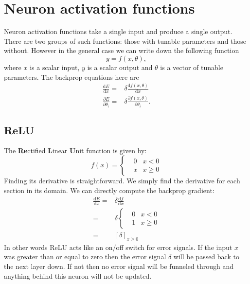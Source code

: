 \documentclass[a4paper]{article}
\begin{document}
\newpage
\section{Neuron activation functions} \label{activation-functions}
Neuron activation functions take a single input and produce a single output. There are two groups of such functions: those with tunable parameters and those without. However in the general case we can write down the following function
\begin{equation}
y = f(x,\theta),
\end{equation}
where $x$ is a scalar input, $y$ is a scalar output and $\theta$ is a vector of tunable parameters. The backprop equations here are 
\begin{align} \label{eq:elementwise}
\frac{\mathrm{d} E }{\mathrm{d} x} = & \delta \frac{\mathrm{d} f(x,\theta)}{\mathrm{d} x}\\
\frac{\partial E }{\partial \theta_i} = & \delta \frac{\partial f(x,\theta)}{\partial \theta_i}.
\end{align}

\subsection{ReLU}
The {\bf Re}ctified {\bf L}inear {\bf U}nit function is given by:
\begin{equation}
f(x)=\left\{\begin{matrix}
 & 0 & x< 0\\ 
 & x & x \geq 0
\end{matrix}\right.
\end{equation}
Finding its derivative is straightforward. We simply find the derivative for each section in its domain. We can directly compute the backprop gradient:
\begin{align}
\frac{\mathrm{d} E }{\mathrm{d} x}= &\delta \frac{\mathrm{d} f }{\mathrm{d} x} \\
= & \delta \left\{\begin{matrix}
 & 0 & x< 0\\ 
 & 1 & x \geq 0
\end{matrix}\right. \\
= & \left [ \delta \right ]_{x \geq 0}
\end{align}
In other words ReLU acts like an on/off switch for error signals. If the input $x$ was greater than or equal to zero then the error signal $\delta$ will be passed back to the next layer down. If not then no error signal will be funneled through and anything behind this neuron will not be updated. 
\end{document}
